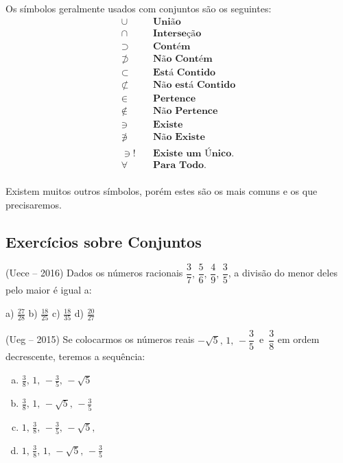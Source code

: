 \begin{multicols*}{2}
	Os símbolos geralmente usados com conjuntos são os seguintes:
	\begin{align*}
		\cup         & \quad\textbf{União}            \\
		\cap         & \quad\textbf{Interseção}       \\
		\supset      & \quad\textbf{Contém}           \\
		\not \supset & \quad\textbf{Não Contém}       \\
		\subset      & \quad\textbf{Está Contido}     \\
		\not \subset & \quad\textbf{Não está Contido} \\
		\in          & \quad\textbf{Pertence}         \\
		\not \in     & \quad\textbf{Não Pertence}     \\
		\ni          & \quad\textbf{Existe}           \\
		\not \ni     & \quad\textbf{Não Existe}       \\
		\ni!         & \quad\textbf{Existe um Único.} \\
		\forall      & \quad\textbf{Para Todo.}       \\
	\end{align*}

	Existem muitos outros símbolos, porém estes são os mais comuns e os que precisaremos.


	\subsection*{Exercícios sobre Conjuntos}

	\setcounter{numexercicio}{0}
	\execnum (Uece  --  2016) Dados os números racionais $ \dfrac{3}{7},\, \dfrac{5}{6},\, \dfrac{4}{9},\, \dfrac{3}{5}$, a divisão do menor deles pelo maior é igual a:

	a) $\frac{27}{28} $ b) $\frac{18}{25} $ c) $\frac{18}{35} $ d) $\frac{20}{27}$

	\execnum (Ueg  --  2015) Se colocarmos os números reais $ - \sqrt{5},\, 1,\, - \dfrac{3}{5}\, $ e $\, \dfrac{3}{8}$ em ordem decrescente, teremos a sequência:

	\begin{enumerate}[(a)]
		\item $\frac{3}{8},\, 1,\,- \frac{3}{5},\, -\sqrt{5}$
		\item $\frac{3}{8},\, 1,\,-\sqrt{5},\, - \frac{3}{5}$
		\item $1,\, \frac{3}{8},\, - \frac{3}{5},\, -\sqrt{5},$
		\item $1,\, \frac{3}{8},\, 1,\, -\sqrt{5},\, - \frac{3}{5}$
	\end{enumerate}


\end{multicols*}
